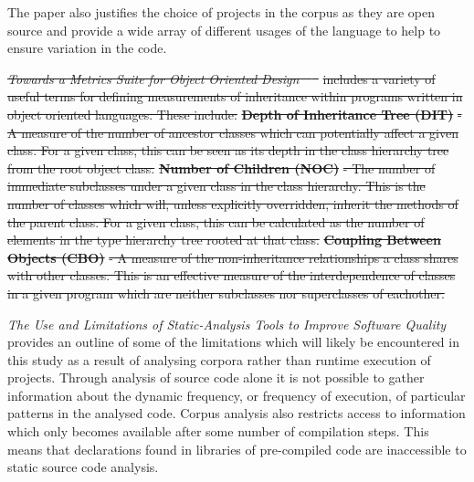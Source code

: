 \documentclass[11pt
              , a4paper
              , twoside
              , openright
              ]{report}
\providecommand{\DIFdel}[1]{{\protect\color{red}\sout{#1}}}                      %
\providecommand{\DIFdelbegin}{} %
\providecommand{\DIFdelend}{} %
\begin{document}
The paper also justifies the choice of projects in the corpus as they are open source and provide a wide array of different usages of the language to help to ensure variation in the code.
\newline

\DIFdelbegin \textit{\DIFdel{Towards a Metrics Suite for Object Oriented Design~\mbox{%
\cite{MetricsSuite}
}%
}} %
\DIFdel{includes a variety of useful terms for defining measurements of inheritance within programs written in object oriented languages. These include:
}%
\textbf{\DIFdel{Depth of Inheritance Tree (DIT)}} %
\DIFdel{- A measure of the number of ancestor classes which can potentially affect a given class. For a given class, this can be seen as its depth in the class hierarchy tree from the root object class.
	}%
\textbf{\DIFdel{Number of Children (NOC)}} %
\DIFdel{- The number of immediate subclasses under a given class in the class hierarchy. This is the number of classes which will, unless explicitly overridden, inherit the methods of the parent class. For a given class, this can be calculated as the number of elements in the type hierarchy tree rooted at that class.
	}%
\textbf{\DIFdel{Coupling Between Objects (CBO)}} %
\DIFdel{- A measure of the non-inheritance relationships a class shares with other classes. This is an effective measure of the interdependence of classes in a given program which are neither subclasses nor superclasses of eachother.
	}%

\DIFdelend \textit{The Use and Limitations of Static-Analysis Tools to Improve Software Quality~\cite{StaticAnalysisLimits}} provides an outline of some of the limitations which will likely be encountered in this study as a result of analysing corpora rather than runtime execution of projects. Through analysis of source code alone it is not possible to gather information about the dynamic frequency, or frequency of execution, of particular patterns in the analysed code. Corpus analysis also restricts access to information which only becomes available after some number of compilation steps. This means that declarations found in libraries of pre-compiled code are inaccessible to static source code analysis.
\end{document}
